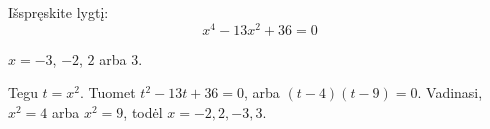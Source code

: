\begin{salyga}
Išspręskite lygtį:
    \[ x^4 - 13x^2 + 36 = 0 \]
\end{salyga}

\begin{atsakymas}
$x=-3$, $-2$, $2$ arba $3$.
\end{atsakymas}

\begin{sprendimas}
Tegu $t=x^2$. Tuomet $t^2-13t+36=0$, arba $(t-4)(t-9)=0$. Vadinasi, $x^2=4$ arba $x^2=9$, todėl $x=-2,2,-3,3$.
\end{sprendimas}
